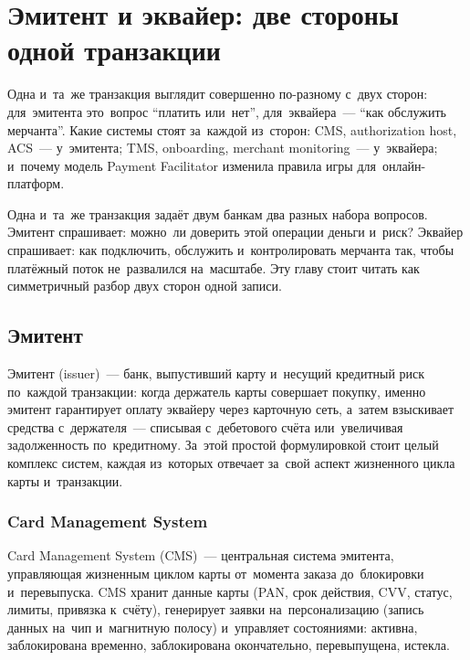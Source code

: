 \chapter{Эмитент и эквайер: две стороны одной транзакции}
\label{ch:issuer-acquirer}

\begin{kaobox}[title=Что вы узнаете из этой главы]
  Одна и~та~же транзакция выглядит совершенно по-разному с~двух
  сторон: для~эмитента это~вопрос \enquote{платить или~нет},
  для~эквайера~--- \enquote{как обслужить мерчанта}. Какие системы
  стоят за~каждой из~сторон: CMS, authorization host, ACS~---
  у~эмитента; TMS, onboarding, merchant monitoring~---
  у~эквайера; и~почему модель Payment Facilitator изменила
  правила игры для~онлайн-платформ.
\end{kaobox}

Одна и~та~же транзакция задаёт двум банкам два разных набора
вопросов. Эмитент спрашивает: можно~ли доверить этой операции
деньги и~риск? Эквайер спрашивает: как подключить, обслужить
и~контролировать мерчанта так, чтобы платёжный поток не~развалился
на~масштабе. Эту главу стоит читать как симметричный разбор двух
сторон одной записи.

\section{Эмитент}
\label{sec:ia-issuer}

Эмитент (issuer)~--- банк, выпустивший карту и~несущий кредитный
риск по~каждой транзакции: когда держатель карты совершает
покупку, именно эмитент гарантирует оплату эквайеру через
карточную сеть, а~затем взыскивает средства с~держателя~---
списывая с~дебетового счёта или~увеличивая задолженность
по~кредитному. За~этой простой формулировкой стоит целый комплекс
систем, каждая из~которых отвечает за~свой аспект жизненного
цикла карты и~транзакции.

\subsection*{Card Management System}

Card Management System (CMS)~--- центральная система эмитента,
управляющая жизненным циклом карты от~момента заказа
до~блокировки и~перевыпуска. CMS хранит данные карты (PAN, срок
действия, CVV, статус, лимиты, привязка к~счёту), генерирует
заявки на~персонализацию (запись данных на~чип и~магнитную полосу)
и~управляет состояниями: активна, заблокирована временно,
заблокирована окончательно, перевыпущена, истекла.

